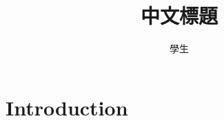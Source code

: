 \documentclass[]{NUKThesis}
\title{中文標題}
\author{學生}
\begin{document}
  \coverpage
  \tableofcontents
  \newpage
  \section{Introduction}
  \lipsum[1-10]
\end{document}
